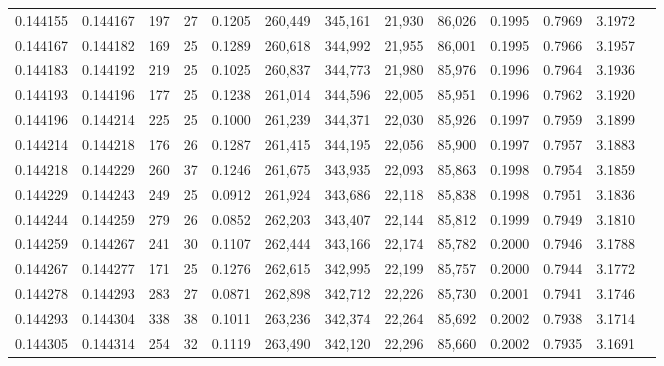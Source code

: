 \begin{tabular}{rrrrrrrrrrrrr}
0.144155 & 0.144167 & 197 &  27 &                                     0.1205 & 260,449 & 345,161 &  21,930 &  86,026 & 0.1995 & 0.7969 & 3.1972 \\
0.144167 & 0.144182 & 169 &  25 &                                     0.1289 & 260,618 & 344,992 &  21,955 &  86,001 & 0.1995 & 0.7966 & 3.1957 \\
0.144183 & 0.144192 & 219 &  25 &                                     0.1025 & 260,837 & 344,773 &  21,980 &  85,976 & 0.1996 & 0.7964 & 3.1936 \\
0.144193 & 0.144196 & 177 &  25 &                                     0.1238 & 261,014 & 344,596 &  22,005 &  85,951 & 0.1996 & 0.7962 & 3.1920 \\
0.144196 & 0.144214 & 225 &  25 &                                     0.1000 & 261,239 & 344,371 &  22,030 &  85,926 & 0.1997 & 0.7959 & 3.1899 \\
0.144214 & 0.144218 & 176 &  26 &                                     0.1287 & 261,415 & 344,195 &  22,056 &  85,900 & 0.1997 & 0.7957 & 3.1883 \\
0.144218 & 0.144229 & 260 &  37 &                                     0.1246 & 261,675 & 343,935 &  22,093 &  85,863 & 0.1998 & 0.7954 & 3.1859 \\
0.144229 & 0.144243 & 249 &  25 &                                     0.0912 & 261,924 & 343,686 &  22,118 &  85,838 & 0.1998 & 0.7951 & 3.1836 \\
0.144244 & 0.144259 & 279 &  26 &                                     0.0852 & 262,203 & 343,407 &  22,144 &  85,812 & 0.1999 & 0.7949 & 3.1810 \\
0.144259 & 0.144267 & 241 &  30 &                                     0.1107 & 262,444 & 343,166 &  22,174 &  85,782 & 0.2000 & 0.7946 & 3.1788 \\
0.144267 & 0.144277 & 171 &  25 &                                     0.1276 & 262,615 & 342,995 &  22,199 &  85,757 & 0.2000 & 0.7944 & 3.1772 \\
0.144278 & 0.144293 & 283 &  27 &                                     0.0871 & 262,898 & 342,712 &  22,226 &  85,730 & 0.2001 & 0.7941 & 3.1746 \\
0.144293 & 0.144304 & 338 &  38 &                                     0.1011 & 263,236 & 342,374 &  22,264 &  85,692 & 0.2002 & 0.7938 & 3.1714 \\
0.144305 & 0.144314 & 254 &  32 &                                     0.1119 & 263,490 & 342,120 &  22,296 &  85,660 & 0.2002 & 0.7935 & 3.1691 \\

\end{tabular}
